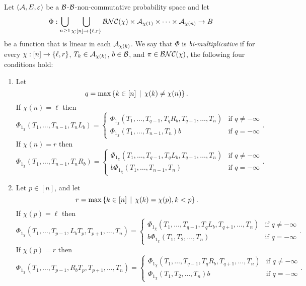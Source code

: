 \begin{definition}
	\label{defnbimultiplicative}
	Let $(\mathcal{A}, E, \varepsilon)$ be a $\mathcal{B}$-$\mathcal{B}$-non-commutative probability space and let 
	\[
		\Phi : \bigcup_{n\geq 1} \bigcup_{\chi : [n] \to \left\{\ell, r\right\}} \mathcal{BNC}(\chi) \times \mathcal{A}_{\chi(1)} \times \cdots \times \mathcal{A}_{\chi(n)} \to B
	\]
	be a function that is linear in each $\mathcal{A}_{\chi(k)}$.
	We say that $\Phi$ is \emph{bi-multiplicative} if for every $\chi : [n] \to \left\{\ell, r\right\}$, $T_k \in \mathcal{A}_{\chi(k)}$, $b \in \mathcal{B}$, and $\pi \in \mathcal{BNC}(\chi)$, the following four conditions hold:
	\begin{enumerate}[label=(\roman*)]
		\item\label{def:bimult:i} Let
			\[
				q = \max\left\{ k \in [n] \, \mid \, \chi(k) \neq \chi(n)\right\}.
			\]
			If $\chi(n) = \ell$ then
			\[
				\Phi_{1_\chi}(T_1, \ldots, T_{n-1}, T_nL_b) = \left\{
					\begin{array}{ll}
						\Phi_{1_\chi}(T_1, \ldots, T_{q-1}, T_q R_b, T_{q+1}, \ldots, T_n) & \text{if } q \neq -\infty
						\\
						\Phi_{1_\chi}(T_1, \ldots, T_{n-1}, T_n)b & \text{if } q = -\infty
				\end{array} \right. .
			\]
			If $\chi(n) = r$ then 
			\[
				\Phi_{1_\chi}(T_1, \ldots, T_{n-1}, T_nR_b) = \left\{
					\begin{array}{ll}
						\Phi_{1_\chi}(T_1, \ldots, T_{q-1}, T_q L_b, T_{q+1}, \ldots, T_n) & \text{if } q \neq -\infty
						\\
						b\Phi_{1_\chi}(T_1, \ldots, T_{n-1}, T_n) & \text{if } q = -\infty
				\end{array} \right. .
			\]

		\item\label{def:bimult:ii} Let $p \in [n]$, and let
			\[
				r = \max\left\{ k \in [n] \, \mid \, \chi(k) = \chi(p), k < p\right\}.
			\]
			If $\chi(p) = \ell$ then
			\[
				\Phi_{1_\chi}(T_1, \ldots, T_{p-1}, L_bT_p, T_{p+1}, \ldots, T_n) = \left\{
					\begin{array}{ll}
						\Phi_{1_\chi}(T_1, \ldots, T_{q-1}, T_qL_b, T_{q+1}, \ldots, T_n) & \text{if } q \neq -\infty
						\\
						b \Phi_{1_\chi}(T_1, T_2, \ldots, T_n) & \text{if } q = -\infty
				\end{array} \right. .
			\]
			If $\chi(p) = r$ then
			\[
				\Phi_{1_\chi}(T_1, \ldots, T_{p-1}, R_bT_p, T_{p+1}, \ldots, T_n) = \left\{
					\begin{array}{ll}
						\Phi_{1_\chi}(T_1, \ldots, T_{q-1}, T_qR_b, T_{q+1}, \ldots, T_n) & \text{if } q \neq -\infty
						\\
						\Phi_{1_\chi}(T_1, T_2, \ldots, T_n) b & \text{if } q = -\infty
				\end{array} \right. .
			\]


\end{enumerate}
\end{definition}
